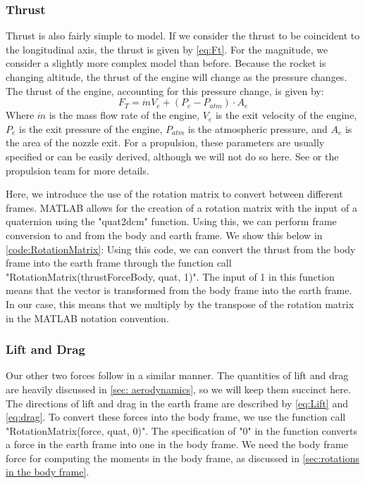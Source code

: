 \documentclass[12pt]{report}
\begin{document}
{\subsubsection{Thrust}
Thrust is also fairly simple to model. If we consider the thrust to be coincident to the longitudinal axis, the thrust is given by \eqref{eq:Ft}. For the magnitude, we consider a slightly more complex model than before. Because the rocket is changing altitude, the thrust of the engine will change as the pressure changes. The thrust of the engine, accounting for this pressure change, is given by:
\begin{equation}
    F_T=\dot{m}V_e+\left(P_{e}-P_{atm}\right)\cdot A_e
\end{equation}
Where $\dot{m}$ is the mass flow rate of the engine, $V_e$ is the exit velocity of the engine, $P_e$ is the exit pressure of the engine, $P_{atm}$ is the atmospheric pressure, and $A_e$ is the area of the nozzle exit. For a propulsion, these parameters are usually specified or can be easily derived, although we will not do so here. See \cite{noauthor_chemical_nodate} or the propulsion team for more details.

Here, we introduce the use of the rotation matrix to convert between different frames. MATLAB allows for the creation of a rotation matrix with the input of a \gls{quaternion} using the "quat2dcm" function. Using this, we can perform frame conversion to and from the body and earth frame. We show this below in \ref{code:RotationMatrix}:
\label{code:RotationMatrix}
Using this code, we can convert the thrust from the body frame into the earth frame through the function call "RotationMatrix(thrustForceBody, quat, 1)". The input of 1 in this function means that the vector is transformed from the body frame into the earth frame. In our case, this means that we multiply by the transpose of the rotation matrix in the MATLAB notation convention.
\subsubsection{Lift and Drag}
Our other two forces follow in a similar manner. The quantities of lift and drag are heavily discussed in \ref{sec: aerodynamics}, so we will keep them succinct here. The directions of lift and drag in the earth frame are described by \eqref{eq:Lift} and \eqref{eq:drag}. To convert these forces into the body frame, we use the function call "RotationMatrix(force, quat, 0)". The specification of "0" in the function converts a force in the earth frame into one in the body frame. We need the body frame force for computing the moments in the body frame, as discussed in \ref{sec:rotations in the body frame}.
}
\end{document}
